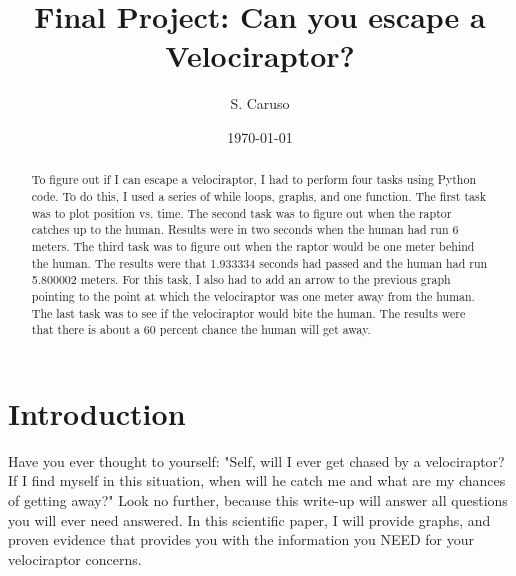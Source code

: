 \documentclass[twocolumn]{revtex4}
\begin{document}
\title{
Final Project: Can you escape a Velociraptor?
}

\author{S. Caruso}

\date{\today}

\begin{abstract}
    
    To figure out if I can escape a velociraptor, I had to perform four tasks using Python code.  To do this, I used a series of while loops, graphs, and one function.  The first task was to plot position vs. time.  The second task was  to figure out when the raptor catches up to the human.  Results were in two seconds when the human had run 6 meters.  The third task was to figure out when the raptor would be one meter behind the human.  The results were that 1.933334 seconds had passed and the human had run 5.800002 meters.  For this task, I also had to add an arrow to the previous graph pointing to the point at which the velociraptor was one meter away from the human.  The last task was to see if the velociraptor would bite the human.  The results were that there is about a 60 percent chance the human will get away. 
\end{abstract}


\maketitle
\section{Introduction}
	Have you ever thought to yourself: "Self, will I ever get chased by a velociraptor? If I find myself in this situation, when will he catch me and what are my chances of getting away?"  Look no further, because this write-up will answer all questions you will ever need answered. In this scientific paper, I will provide graphs, and proven evidence that provides you with the information you NEED for your velociraptor concerns.


\end{document}
